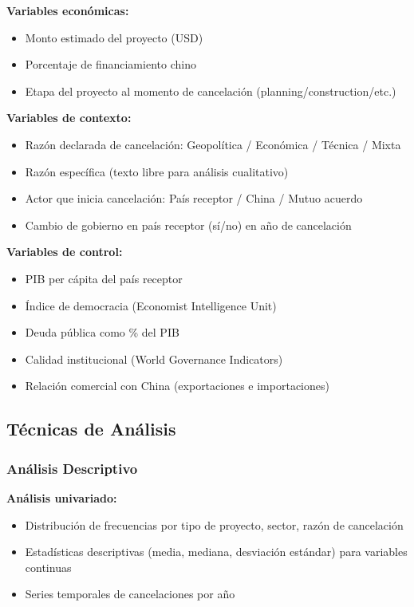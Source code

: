 \documentclass[12pt]{article}
\begin{document}
\textbf{Variables económicas:}
\begin{itemize}
    \item Monto estimado del proyecto (USD)
    \item Porcentaje de financiamiento chino
    \item Etapa del proyecto al momento de cancelación (planning/construction/etc.)
\end{itemize}

\textbf{Variables de contexto:}
\begin{itemize}
    \item Razón declarada de cancelación: Geopolítica / Económica / Técnica / Mixta
    \item Razón específica (texto libre para análisis cualitativo)
    \item Actor que inicia cancelación: País receptor / China / Mutuo acuerdo
    \item Cambio de gobierno en país receptor (sí/no) en año de cancelación
\end{itemize}

\textbf{Variables de control:}
\begin{itemize}
    \item PIB per cápita del país receptor
    \item Índice de democracia (Economist Intelligence Unit)
    \item Deuda pública como \% del PIB
    \item Calidad institucional (World Governance Indicators)
    \item Relación comercial con China (exportaciones e importaciones)
\end{itemize}

\subsection{Técnicas de Análisis}

\subsubsection{Análisis Descriptivo}

\textbf{Análisis univariado:}
\begin{itemize}
    \item Distribución de frecuencias por tipo de proyecto, sector, razón de cancelación
    \item Estadísticas descriptivas (media, mediana, desviación estándar) para variables continuas
    \item Series temporales de cancelaciones por año
\end{itemize}
\end{document}
